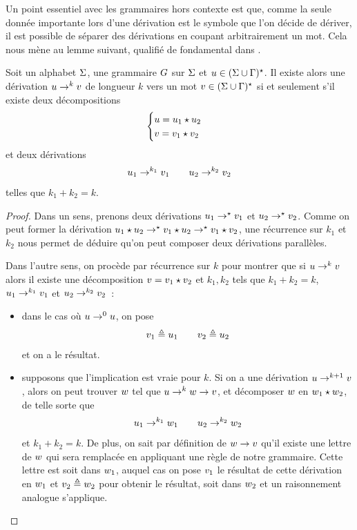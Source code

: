 Un point essentiel avec les grammaires hors contexte est que, comme la seule
donnée importante lors d'une dérivation est le symbole que l'on décide de
dériver, il est possible de séparer des dérivations en coupant arbitrairement un
mot. Cela nous mène au lemme suivant, qualifié de fondamental dans
\cite{Carton2014}.

\begin{lemma}
  Soit un alphabet $\Sigma$, une grammaire $G$ sur $\Sigma$ et
  $u \in (\Sigma\cup\Gamma)^{\star}$. Il existe alors une dérivation $u \to^k v$
  de longueur $k$ vers un mot $v \in (\Sigma\cup\Gamma)^{\star}$ si et seulement s'il existe
  deux décompositions
  \[\begin{cases}
  u = u_1\mathbin{\star} u_2 \\
  v = v_1\mathbin{\star} v_2
  \end{cases}\]
  et deux dérivations
  \[ u_1 \to^{k_1} v_1 \qquad u_2 \to^{k_2} v_2\]
  telles que $k_1 + k_2 = k$.
\end{lemma}

\begin{proof}
  Dans un sens, prenons deux dérivations $u_1 \to^{\mathord{\star}} v_1$ et
  $u_2\to^{\mathord{\star}} v_2$. Comme on peut former la dérivation
  $u_1 \mathbin{\star} u_2 \to^{\mathord{\star}} v_1 \mathbin{\star} u_2\to^{\mathord{\star}}
  v_1 \mathbin{\star} v_2$,
  une récurrence sur $k_1$ et $k_2$ nous permet de déduire qu'on peut composer
  deux dérivations parallèles.

  Dans l'autre sens, on procède par récurrence sur $k$ pour montrer que si
  $u \to^k v$ alors il existe une décomposition
  $v = v_1\mathbin{\star} v_2$ et $k_1,k_2$
  tels que $k_1+k_2 = k$, $u_1\to^{k_1} v_1$ et
  $u_2\to^{k_2}v_2$~:
  \begin{itemize}
  \item dans le cas où $u \to^0 u$, on pose
    \[v_1\triangleq u_1 \qquad v_2 \triangleq u_2\]
    et on a le résultat.
  \item supposons que l'implication est vraie pour $k$. Si on a une dérivation
    $u \to^{k+1} v$, alors on peut trouver $w$ tel que
    $u \to^k w \to v$, et décomposer $w$ en
    $w_1\mathbin{\star} w_2$, de telle sorte que
    \[u_1 \to^{k_1} w_1 \qquad u_2 \to^{k_2} w_2\]
    et $k_1 + k_2 = k$. De plus, on sait par définition de $w \to v$
    qu'il existe une lettre de $w$ qui sera remplacée en appliquant une
    règle de notre grammaire. Cette lettre est soit dans $w_1$, auquel cas
    on pose $v_1$ le résultat de cette dérivation en $w_1$ et
    $v_2 \triangleq w_2$ pour obtenir le résultat, soit dans $w_2$ et
    un raisonnement analogue s'applique.\qedhere
  \end{itemize}
\end{proof}

